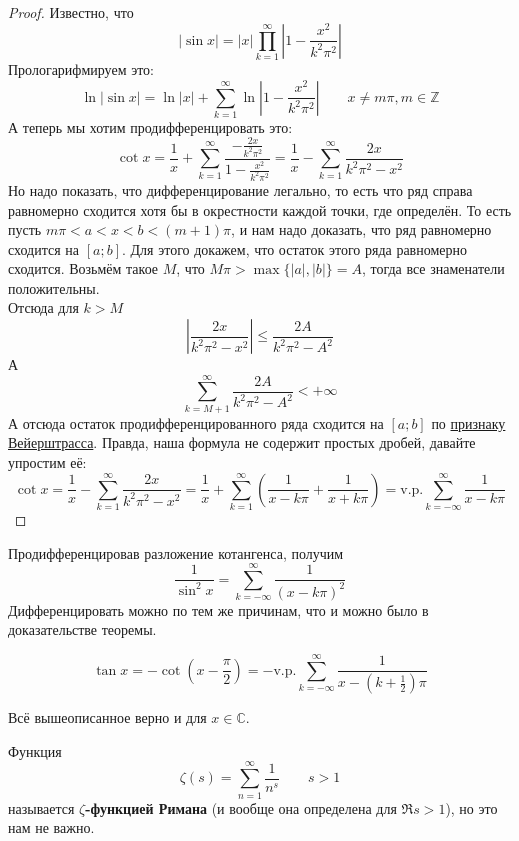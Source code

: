 \documentclass{article}
\begin{document}
    \begin{proof}
        Известно, что
        $$
        |\sin x|=|x|\prod\limits_{k=1}^\infty\left|1-\frac{x^2}{k^2\pi^2}\right|
        $$
        Прологарифмируем это:
        $$
        \ln|\sin x|=\ln|x|+\sum\limits_{k=1}^\infty\ln\left|1-\frac{x^2}{k^2\pi^2}\right|\qquad x\neq m\pi,m\in\mathbb Z
        $$
        А теперь мы хотим продифференцировать это:
        $$
        \cot x=\frac1x+\sum\limits_{k=1}^\infty\frac{-\frac{2x}{k^2\pi^2}}{1-\frac{x^2}{k^2\pi^2}}=\frac1x-\sum\limits_{k=1}^\infty\frac{2x}{k^2\pi^2-x^2}
        $$
        Но надо показать, что дифференцирование легально, то есть что ряд справа равномерно сходится хотя бы в окрестности каждой точки, где определён. То есть пусть $m\pi<a<x<b<(m+1)\pi$, и нам надо доказать, что ряд равномерно сходится на $[a;b]$. Для этого докажем, что остаток этого ряда равномерно сходится. Возьмём такое $M$, что $M\pi>\max\{|a|,|b|\}=A$, тогда все знаменатели положительны.\\
        Отсюда для $k>M$
        $$
        \left|\frac{2x}{k^2\pi^2-x^2}\right|\leqslant\frac{2A}{k^2\pi^2-A^2}
        $$
        А
        $$
        \sum\limits_{k=M+1}^\infty\frac{2A}{k^2\pi^2-A^2}<+\infty
        $$
        А отсюда остаток продифференцированного ряда сходится на $[a;b]$ по \hyperref[Признак Вейерштрасса]{признаку Вейерштрасса}. Правда, наша формула не содержит простых дробей, давайте упростим её:
        $$
        \cot x=\frac1x-\sum\limits_{k=1}^\infty\frac{2x}{k^2\pi^2-x^2}=\frac1x+\sum\limits_{k=1}^\infty\left(\frac1{x-k\pi}+\frac1{x+k\pi}\right)=\mathrm{v.p.}\sum\limits_{k=-\infty}^\infty\frac1{x-k\pi}
        $$
    \end{proof}
    \begin{corollary}
        Продифференцировав разложение котангенса, получим
        $$
        \frac1{\sin^2x}=\sum\limits_{k=-\infty}^\infty\frac1{(x-k\pi)^2}
        $$
        Дифференцировать можно по тем же причинам, что и можно было в доказательстве теоремы.
    \end{corollary}
    \begin{corollary}
        $$
        \tan x=-\cot\left(x-\frac\pi2\right)=-\mathrm{v.p.}\sum\limits_{k=-\infty}^\infty\frac1{x-\left(k+\frac12\right)\pi}
        $$
    \end{corollary}
    \begin{remark}
        Всё вышеописанное верно и для $x\in\mathbb C$.
    \end{remark}
    \begin{definition}
        Функция
        $$
        \zeta(s)=\sum\limits_{n=1}^\infty\frac1{n^s}\qquad s>1
        $$
        называется \textbf{$\zeta$-функцией Римана} (и вообще она определена для $\Re s>1$), но это нам не важно.
    \end{definition}
\end{document}
